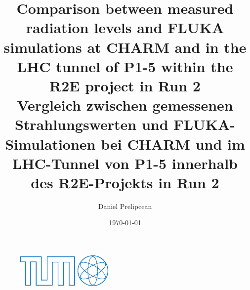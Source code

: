 \documentclass[encoding=utf8,british]{tumphthesis}
\title{Comparison between measured radiation levels and FLUKA simulations at CHARM and in the LHC tunnel of P1-5 within the R2E project in Run 2\\Vergleich zwischen gemessenen Strahlungswerten und FLUKA-Simulationen bei CHARM und im LHC-Tunnel von P1-5 innerhalb des R2E-Projekts in Run 2}
\author{Daniel Prelipcean}
\date{\today}
\begin{document}

\frontmatter


\begin{titlepage}
 
\begin{figure}
    \centering
    \begin{minipage}{0.23\textwidth}
    \includegraphics[width=1.0\linewidth]{figures/tumlogo.pdf}
    \end{minipage}
    \hfill
    \begin{minipage}{0.23\textwidth}
    \centering
    \includegraphics[width=1.0\linewidth]{Abbildungen/PH.pdf}

\end{minipage}
\end{figure}
\end{titlepage}
\end{document}
